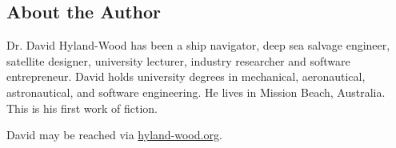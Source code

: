 % 
% 

\vspace*{\fill}
\begin{center}
\section*{\textbf{About the Author}}
\end{center}


Dr. David Hyland-Wood has been a ship navigator, deep sea salvage engineer, satellite designer, university lecturer, industry researcher and software entrepreneur. David holds university degrees in mechanical, aeronautical, astronautical, and software engineering. He lives in Mission Beach, Australia. This is his first work of fiction.

David may be reached via \href{hyland-wood.org}{hyland-wood.org}.
\vspace*{\fill}
